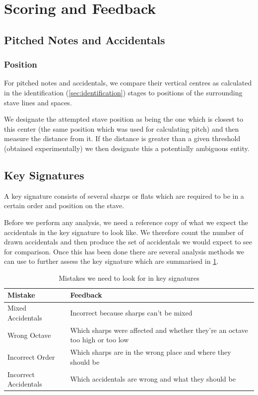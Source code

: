 \section{Scoring and Feedback}
\label{sec:scoring}

\subsection{Pitched Notes and Accidentals}
\label{sec:pitched-notes-accidentals}

\subsubsection{Position}

For pitched notes and accidentals, we compare their vertical centres as calculated in the identification (\cref{sec:identification}) stages to positions of the surrounding stave lines and spaces.

We designate the attempted stave position as being the one which is closest to this center (the same position which was used for calculating pitch) and then measure the distance from it. If the distance is greater than a given threshold (obtained experimentally) we then designate this a potentially ambiguous entity.

\subsection{Key Signatures}

A key signature consists of several sharps or flats which are required to be in a certain order and position on the stave.

Before we perform any analysis, we need a reference copy of what we expect the accidentals in the key signature to look like. We therefore count the number of drawn accidentals and then produce the set of accidentals we would expect to see for comparison. Once this has been done there are several analysis methods we can use to further assess the key signature which are summarised in \cref{table:key-signature-errors}.

\begin{table}[H]
    \renewcommand{\arraystretch}{1.6}
    \begin{tabularx}{\textwidth}{ lX }
        \toprule
        Mistake & Feedback \\
        \midrule
        Mixed Accidentals & Incorrect because sharps can't be mixed \\
        Wrong Octave & Which sharps were affected and whether they're an octave too high or too low \\
        Incorrect Order & Which sharps are in the wrong place and where they should be \\
        Incorrect Accidentals & Which accidentals are wrong and what they should be \\
        \bottomrule
    \end{tabularx}

    \caption{Mistakes we need to look for in key signatures}
    \label{table:key-signature-errors}
\end{table}

